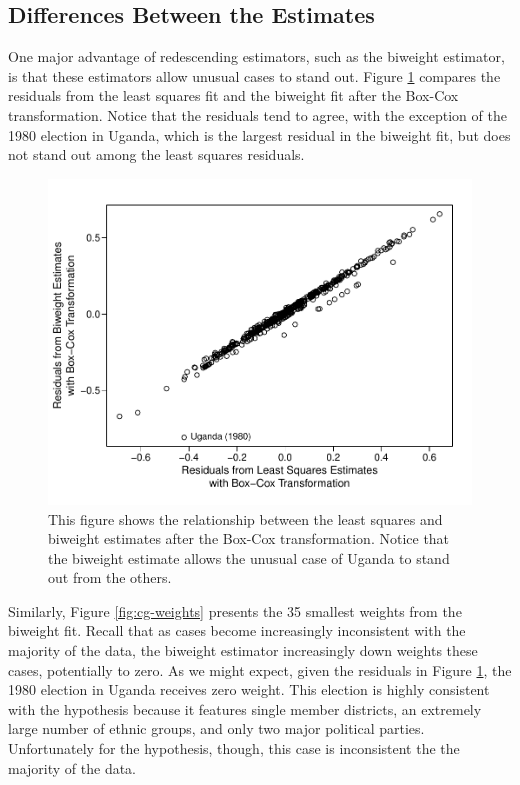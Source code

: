 \documentclass[12pt]{article}
\begin{document}
\subsection*{Differences Between the Estimates}

One major advantage of redescending estimators, such as the biweight estimator, is that these estimators allow unusual cases to stand out. Figure \ref{fig:cg-residuals-compare} compares the residuals from the least squares fit and the biweight fit after the Box-Cox transformation. Notice that the residuals tend to agree, with the exception of the 1980 election in Uganda, which is the largest residual in the biweight fit, but does not stand out among the least squares residuals.

\begin{figure}[H]
\begin{center}
\includegraphics[scale = 0.8]{figs/cg-residuals-compare.pdf}
\caption{This figure shows the relationship between the least squares and biweight estimates after the Box-Cox transformation. Notice that the biweight estimate allows the unusual case of Uganda to stand out from the others.}\label{fig:cg-residuals-compare}
\end{center}
\end{figure}

Similarly, Figure \ref{fig:cg-weights} presents the 35 smallest weights from the biweight fit. Recall that as cases become increasingly inconsistent with the majority of the data, the biweight estimator increasingly down weights these cases, potentially to zero. As we might expect, given the residuals in Figure \ref{fig:cg-residuals-compare}, the 1980 election in Uganda receives zero weight. This election is highly consistent with the hypothesis because it features single member districts, an extremely large number of ethnic groups, and only two major political parties. Unfortunately for the hypothesis, though, this case is inconsistent the the majority of the data.
\end{document}
